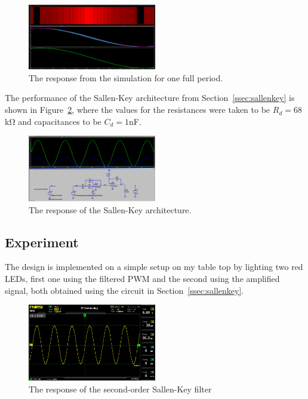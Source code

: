 \begin{figure}[t]
\includegraphics[width=0.5\textwidth]{./figures/pwm_filtered_one_two_final_signal.png}
\caption{The response from the simulation for one full period.} 
\label{fig:response}
\end{figure}


The performance of the Sallen-Key architecture from Section~\ref{ssec:sallenkey}
is shown in Figure~\ref{fig:sallenkey_sim}, where the values for the resistances
were taken to be $R_d = 68$\unit{\kilo\ohm} and capacitances to be $C_d =
1$\unit{\nano\farad}.

\begin{figure}[t]
\includegraphics[width=0.5\textwidth]{./figures/sallenkey.png}
\caption{The response of the Sallen-Key architecture.}
\label{fig:sallenkey_sim}
\end{figure}


\vspace{-1em}
\subsection{Experiment}
\vspace{-1em}

The design is implemented on a simple setup on my table top by lighting two red
LEDs, first one using the filtered PWM and the second using the amplified
signal, both obtained using the circuit in Section~\ref{ssec:sallenkey}.


\begin{figure}[h]
    \includegraphics[width=0.5\textwidth]{./figures/output_osc.jpg}
    \caption{The response of the second-order Sallen-Key filter}
    \label{fig:sallenkey_osc}
\end{figure}

